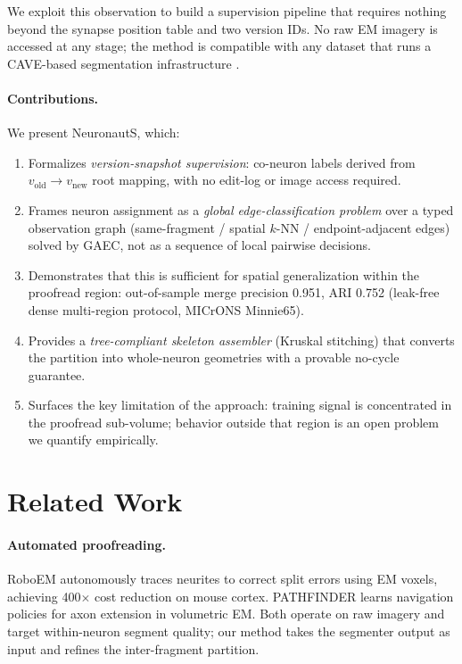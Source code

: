 \documentclass[10pt,letterpaper]{article}
\newcommand{\neuronauts}{NeuronautS\xspace}
\begin{document}
We exploit this observation to build a supervision pipeline that requires nothing beyond
the synapse position table and two version IDs. No raw EM imagery is accessed at any
stage; the method is compatible with any dataset that runs a CAVE-based segmentation
infrastructure \cite{dorkenwald2023cave}.

\paragraph{Contributions.} We present \neuronauts, which:
\begin{enumerate}
\item Formalizes \emph{version-snapshot supervision}: co-neuron labels derived from
  $v_\text{old} \to v_\text{new}$ root mapping, with no edit-log or image access required.
\item Frames neuron assignment as a \emph{global edge-classification problem} over a
  typed observation graph (same-fragment / spatial $k$-NN / endpoint-adjacent edges)
  solved by GAEC, not as a sequence of local pairwise decisions.
\item Demonstrates that this is sufficient for spatial generalization within the
  proofread region: out-of-sample merge precision 0.951, ARI 0.752 (leak-free dense
  multi-region protocol, MICrONS Minnie65).
\item Provides a \emph{tree-compliant skeleton assembler} (Kruskal stitching) that
  converts the partition into whole-neuron geometries with a provable no-cycle guarantee.
\item Surfaces the key limitation of the approach: training signal is concentrated in
  the proofread sub-volume; behavior outside that region is an open problem we quantify
  empirically.
\end{enumerate}

\section{Related Work}

\paragraph{Automated proofreading.} RoboEM \cite{schmidt2024roboem} autonomously traces
neurites to correct split errors using EM voxels, achieving 400$\times$ cost reduction
on mouse cortex. PATHFINDER \cite{januszewski2025pathfinder} learns navigation policies
for axon extension in volumetric EM. Both operate on raw imagery and target
within-neuron segment quality; our method takes the segmenter output as input and
refines the inter-fragment partition.
\end{document}
